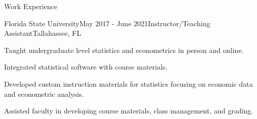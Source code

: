 \documentclass{resume} %
\begin{document}
\begin{rSection}{Work Experience}



\begin{rSubsection}{Florida State University}{May 2017 - June 2021}{Instructor/Teaching Assistant}{Tallahassee, FL}
    \item Taught undergraduate level statistics and econometrics in person and online. 
    \item Integrated statistical software with course materials.
    \item Developed custom instruction materials for statistics focusing on economic data and econometric analysis.
    \item Assisted faculty in developing course materials, class management, and grading.

\end{rSubsection}


\end{rSection}
\end{document}
